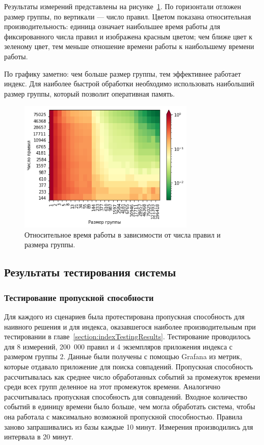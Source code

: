 \documentclass[14pt]{article}
\begin{document}
Результаты измерений представлены на рисунке~\ref{fig:pointScript}. По горизонтали отложен размер группы, по вертикали --- число правил. Цветом показана относительная производительность: единица означает наибольшее время работы для фиксированного числа правил и изображена красным цветом; чем ближе цвет к зеленому цвет, тем меньше отношение времени работы к наибольшему времени работы.

По графику заметно: чем больше размер группы, тем эффективнее работает индекс. Для наиболее быстрой обработки необходимо использовать наибольший размер группы, который позволит оперативная память.

\begin{figure}[h!]
    \centering
    \includegraphics[width=0.75\textwidth]{images/pointScript.png}
    \caption{Относительное время работы в зависимости от числа правил и размера группы.}
    \label{fig:pointScript}
\end{figure}

\subsection{Результаты тестирования системы}
\subsubsection{Тестирование пропускной способности}
Для каждого из сценариев была протестирована пропускная способность для наивного решения и для индекса, оказавшегося наиболее производительным при тестировании в главе~\ref{section:indexTestingResults}. Тестирование проводилось для 8 измерений, 200~000 правил и 4 экземпляров приложения индекса с размером группы 2. Данные были получены с помощью Grafana из метрик, которые отдавало приложение для поиска совпадений. Пропускная способность рассчитывалась как среднее число обработанных событий за промежуток времени среди всех групп деленное на этот промежуток времени. Аналогично рассчитывалась пропускная способность для совпадений. Входное количество событий в единицу времени было больше, чем могла обработать система, чтобы она работала с максимально возможной пропускной способностью. Правила заново запрашивались из базы каждые 10 минут. Измерения производились для интервала в 20 минут.
\end{document}
